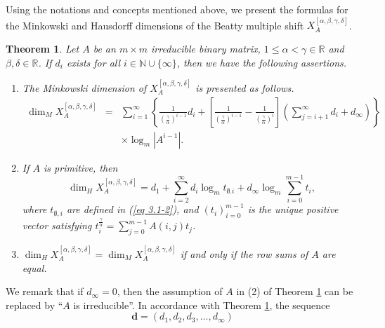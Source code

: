 \documentclass{amsart}
\newtheorem{theorem}{Theorem}[section]
\theoremstyle{definition}
\numberwithin{equation}{section}%
\begin{document}
Using the notations and concepts mentioned above, we present the formulas for the Minkowski and Hausdorff dimensions of the Beatty multiple shift $
X_{A}^{\left[ \alpha ,\beta ,\gamma ,\delta \right] }$.

\begin{theorem}\label{Thm: 1}
Let $A$ be an $m\times m$ irreducible binary matrix, $1\leq \alpha <\gamma\in \mathbb{R}$ and $\beta, \delta \in\mathbb{R}$. If $d_{i}$ exists for all $i\in \mathbb{N}\cup \{\infty \}$, then we have the following assertions.

\begin{enumerate}
\item The Minkowski dimension of $X_{A}^{\left[ \alpha ,\beta ,\gamma
,\delta \right] }$ is presented as follows. 
\begin{eqnarray*}
\dim _{M}X_{A}^{\left[ \alpha ,\beta ,\gamma ,\delta \right] }
&=&\sum_{i=1}^{\infty }\left\{ \frac{1}{\left( \frac{\gamma }{\alpha }\right) ^{i-1}}d_{i}+\left[ \frac{1}{\left( \frac{\gamma }{\alpha }\right)
^{i-1}}-\frac{1}{\left( \frac{\gamma }{\alpha }\right) ^{i}}\right] \left(
\sum_{j=i+1}^{\infty }d_{i}+d_{\infty }\right) \right\} \\
&&\times \log_{m}\left\vert A^{i-1}\right\vert \text{.}
\end{eqnarray*}

\item If $A$ is primitive, then 
\[
\dim _{H}X_{A}^{\left[ \alpha ,\beta ,\gamma ,\delta \right]
}=d_{1}+\sum_{i=2}^{\infty }d_{i}\log _{m}t_{\emptyset .i}+d_{\infty }\log
_{m}\sum_{i=0}^{m-1}t_{i}\text{,} 
\]
where $t_{\emptyset ,i}$ are defined in (\ref{eq 3.1-2}), and $(t_{i})_{i=0}^{m-1}$ is the
unique positive vector satisfying $t_{i}^{\frac{\gamma }{\alpha }}=\sum_{j=0}^{m-1}A(i,j)t_{j}$.

\item $\dim _{H}X_{A}^{\left[ \alpha ,\beta ,\gamma ,\delta \right] }=\dim_{M}X_{A}^{\left[ \alpha ,\beta ,\gamma ,\delta \right] }$ if and only if the row sums of $A$ are equal.
\end{enumerate}
\end{theorem}
We remark that if $d_\infty=0$, then the assumption of $A$ in (2) of Theorem \ref{Thm: 1} can be replaced by ``$A$ is irreducible''. In accordance with Theorem \ref{Thm: 1}, the sequence 
\begin{equation} \label{2}
\mathbf{d}=(d_{1},d_{2},d_{3},\ldots ,d_{\infty }) 
\end{equation}
\end{document}
